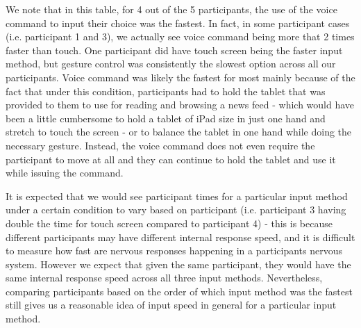 \documentclass{sigchi}
\begin{document}
\begin{table}[H] %
\centering
\caption{Times taken, in seconds, by each participant for each input method, when using a mobile device/tablet to read when a request to intervene was issued}
\label{table:timeMobilePhone}
\end{table}
We note that in this table, for 4 out of the 5 participants, the use of the voice command to input their choice was the fastest. In fact, in some participant cases (i.e. participant 1 and 3), we actually see voice command being more that 2 times faster than touch. One participant did have touch screen being the faster input method, but gesture control was consistently the slowest option across all our participants. Voice command was likely the fastest for most mainly because of the fact that under this condition, participants had to hold the tablet that was provided to them to use for reading and browsing a news feed - which would have been a little cumbersome to hold a tablet of iPad size in just one hand and stretch to touch the screen - or to balance the tablet in one hand while doing the necessary gesture. Instead, the voice command does not even require the participant to move at all and they can continue to hold the tablet and use it while issuing the command.

It is expected that we would see participant times for a particular input method under a certain condition to vary based on participant (i.e. participant 3 having double the time for touch screen compared to participant 4) - this is because different participants may have different internal response speed, and it is difficult to measure how fast are nervous responses happening in a participants nervous system. However we expect that given the same participant, they would have the same internal response speed across all three input methods. Nevertheless, comparing participants based on the order of which input method was the fastest still gives us a reasonable idea of input speed in general for a particular input method.
\end{document}
